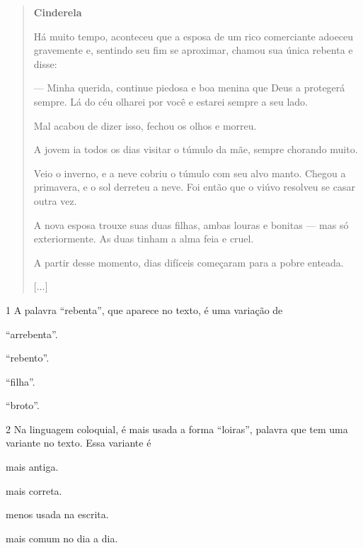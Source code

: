 \begin{quote}
\textbf{Cinderela}

Há muito tempo, aconteceu que a esposa de um rico
comerciante adoeceu gravemente e, sentindo seu fim se
aproximar, chamou sua única rebenta e disse:

--- Minha querida, continue piedosa e boa menina que
Deus a protegerá sempre. Lá do céu olharei por você e estarei
sempre a seu lado.

Mal acabou de dizer isso, fechou os olhos e morreu.

A jovem ia todos os dias visitar o túmulo da mãe,
sempre chorando muito.

Veio o inverno, e a neve cobriu o túmulo com seu alvo
manto. Chegou a primavera, e o sol derreteu a neve. Foi então
que o viúvo resolveu se casar outra vez.

A nova esposa trouxe suas duas filhas, ambas louras e
bonitas --- mas só exteriormente. As duas tinham a alma feia
e cruel.

A partir desse momento, dias difíceis começaram para
a pobre enteada.

{[}...{]}

\end{quote}

\num{1} A palavra ``rebenta'', que aparece no texto, é uma variação de

\begin{escolha}[itemsep=-5pt]
\item ``arrebenta''.

\item ``rebento''.

\item ``filha''.

\item ``broto''.
\end{escolha}

\num{2} Na linguagem coloquial, é mais usada a forma ``loiras'', palavra que tem uma variante no texto. Essa variante é

\begin{escolha}[itemsep=-5pt]
\item mais antiga.

\item mais correta.

\item menos usada na escrita.

\item mais comum no dia a dia.
\end{escolha}

